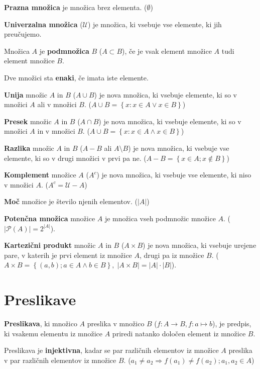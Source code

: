 \documentclass[a4paper,oneside,12pt,fleqn]{article}
\newcommand\krat\cdot
\renewcommand\implies\Rightarrow
\numberwithin{equation}{section}
\begin{document}
\textbf{Prazna množica} je množica brez elementa. ($\emptyset$)

\textbf{Univerzalna množica} ($\mathcal{U}$) je množica, ki vsebuje vse elemente, ki jih preučujemo.

Množica $A$ je \textbf{podmnožica} $B$ ($A \subset B$), če je vsak element množice $A$ tudi element
množice $B$.

Dve množici sta \textbf{enaki}, če imata iste elemente.

\textbf{Unija} množic $A$ in $B$ ($A \cup B$) je nova množica, ki vsebuje elemente, ki so v množici $A$ ali v
množici $B$. ($A \cup B = \left\{x:x \in A \lor x \in B \right\}$)

\textbf{Presek} množic $A$ in $B$ ($A \cap B$) je nova množica, ki vsebuje elemente, ki so v množici $A$ in v
množici $B$. ($A \cup B = \left\{x:x \in A \land x \in B \right\}$)

\textbf{Razlika} množic $A$ in $B$ ($A - B$ ali $A \setminus B$) je nova množica, ki vsebuje vse elemente, ki so v drugi množici
v prvi pa ne. ($A - B = \left\{x \in A; x \notin B \right\}$)

\textbf{Komplement} množice $A$ ($A^c$) je nova množica, ki vsebuje vse elemente, ki niso
v množici $A$. ($A^c = \mathcal{U} - A$)

\textbf{Moč} množice je število njenih elementov. ($|A|$) 

\textbf{Potenčna množica} množice $A$ je množica vseh podmnožic množice $A$.
($|\mathcal{P}(A)| = 2^{|A|}$). 

\textbf{Kartezični produkt} množic $A$ in $B$ ($A \times B$) je nova množica, ki vsebuje urejene pare, v katerih
je prvi element iz množice $A$, drugi pa iz množice $B$. ($A \times B = \left\{ \left(a,
b \right); a \in A \land b \in B \right\}, \; \left|A \times B \right| = \left|A\right|
\krat \left|B\right|$).

\section{Preslikave}
\label{sec:preslikave}
\textbf{Preslikava}, ki množico $A$ preslika v množico $B$ ($f\!\!: A \rightarrow B,
f\!\!:a \mapsto b$), je predpis, ki vsakemu elementu iz
množice $A$ priredi natanko določen element iz množice $B$. 

Preslikava je \textbf{injektivna}, kadar se par različnih elementov iz množice $A$ preslika v par
različnih elementov iz množice $B$. ($a_1 \neq a_2 \implies f(a_1) \neq f(a_2); a_1, a_2
\in A$)
\end{document}
